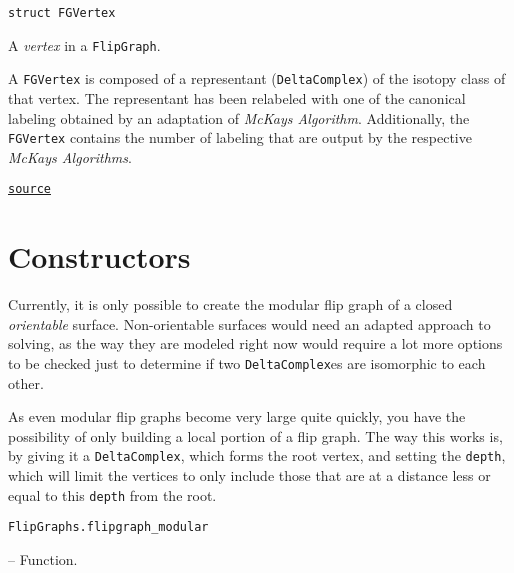 \begin{adjustwidth}{2em}{0pt}


\begin{verbatim}
struct FGVertex
\end{verbatim}

A \emph{vertex} in a \texttt{FlipGraph}. 

A \texttt{FGVertex} is composed of a representant (\texttt{DeltaComplex}) of the isotopy class of that vertex.  The representant has been relabeled with one of the canonical labeling obtained by an adaptation of \emph{McKay{\textquotesingle}s Algorithm}. Additionally, the \texttt{FGVertex} contains the number of labeling that are output by the respective \emph{McKay{\textquotesingle}s Algorithms}.



\href{https://github.com/schto223/FlipGraphs.jl/blob/490c01a7adf74b42f27dda05099165c47ae8133e/src/flipGraph.jl#L33-L41}{\texttt{source}}


\end{adjustwidth}

\section{Constructors}



\label{1468722345706912774}{}


Currently, it is only possible to create the modular flip graph of a closed \emph{orientable} surface. Non-orientable surfaces would need an adapted approach to solving, as the way they are modeled right now would require a lot more options to be checked just to determine if two \texttt{DeltaComplex}es are isomorphic to each other.



As even modular flip graphs become very large quite quickly, you have the possibility of only building a local portion of a flip graph. The way this works is, by giving it a \texttt{DeltaComplex}, which forms the root vertex, and setting the \texttt{depth}, which will limit the vertices to only include those that are at a distance less or equal to this \texttt{depth} from the root.


\hypertarget{11553076379005232901}{\texttt{FlipGraphs.flipgraph\_modular}}  -- {Function.}


